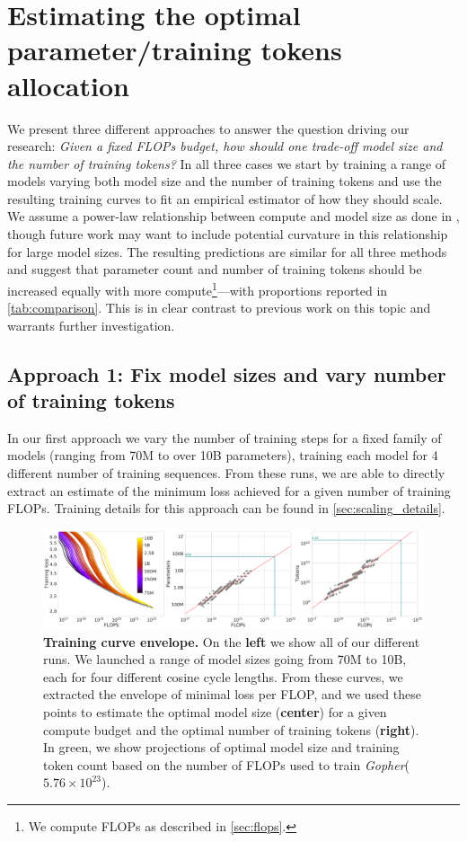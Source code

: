 \documentclass[11pt, a4paper, logo, copyright, nonumbering]{deepmind}
\newcommand{\gopher}{\textit{Gopher}\xspace}
\begin{document}
\section{Estimating the optimal parameter/training tokens allocation}
\label{sec:method}
We present three different approaches to answer the question driving our research: 
\textit{Given a fixed FLOPs budget, how should one trade-off model size and the number of training tokens?} 
In all three cases we start by training a range of models varying both model size and the number of training tokens and use the resulting training curves to fit an empirical estimator of how they should scale. 
We assume a power-law relationship between compute and model size as done in \citet{clark2022unified, kaplan2020scaling}, though future work may want to include potential curvature in this relationship for large model sizes.
The resulting predictions are similar for all three methods and suggest that parameter count and number of training tokens should be increased equally with more compute\footnote{We compute FLOPs as described in \autoref{sec:flops}.}---with proportions reported in \autoref{tab:comparison}.
This is in clear contrast to previous work on this topic and warrants further investigation.

\subsection{Approach 1: Fix model sizes and vary number of training tokens}

In our first approach we vary the number of training steps for a fixed family of models (ranging from 70M to over 10B parameters), training each model for 4 different number of training sequences.
From these runs, we are able to directly extract an estimate of the minimum loss achieved for a given number of training FLOPs. Training details for this approach can be found in \autoref{sec:scaling_details}.

\begin{figure}[t]
    \centering
    \includegraphics[width=.95\textwidth]{figures/scaling_11.pdf}
    \caption{\textbf{Training curve envelope.} On the \textbf{left} we show all of our different runs. We launched a range of model sizes going from 70M to 10B, each for four different cosine cycle lengths. From these curves, we extracted the envelope of minimal loss per FLOP, and we used these points to estimate the optimal model size (\textbf{center}) for a given compute budget and the optimal number of training tokens (\textbf{right}). 
    In green, we show projections of optimal model size and training token count based on the number of FLOPs used to train \gopher ($5.76 \times 10^{23}$).
    }
    \label{fig:approach1}
\end{figure}
\end{document}
